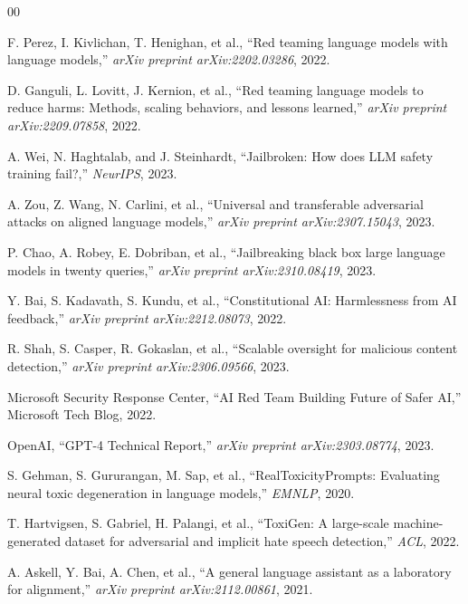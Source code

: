 \documentclass[compsoc,conference,a4paper,10pt,times]{IEEEtran}
\begin{document}

\begin{thebibliography}{00}

 F. Perez, I. Kivlichan, T. Henighan, et al., ``Red teaming language models with language models,'' \emph{arXiv preprint arXiv:2202.03286}, 2022.

 D. Ganguli, L. Lovitt, J. Kernion, et al., ``Red teaming language models to reduce harms: Methods, scaling behaviors, and lessons learned,'' \emph{arXiv preprint arXiv:2209.07858}, 2022.

 A. Wei, N. Haghtalab, and J. Steinhardt, ``Jailbroken: How does LLM safety training fail?,'' \emph{NeurIPS}, 2023.

 A. Zou, Z. Wang, N. Carlini, et al., ``Universal and transferable adversarial attacks on aligned language models,'' \emph{arXiv preprint arXiv:2307.15043}, 2023.

 P. Chao, A. Robey, E. Dobriban, et al., ``Jailbreaking black box large language models in twenty queries,'' \emph{arXiv preprint arXiv:2310.08419}, 2023.

 Y. Bai, S. Kadavath, S. Kundu, et al., ``Constitutional AI: Harmlessness from AI feedback,'' \emph{arXiv preprint arXiv:2212.08073}, 2022.

 R. Shah, S. Casper, R. Gokaslan, et al., ``Scalable oversight for malicious content detection,'' \emph{arXiv preprint arXiv:2306.09566}, 2023.

 Microsoft Security Response Center, ``AI Red Team Building Future of Safer AI,'' Microsoft Tech Blog, 2022.

 OpenAI, ``GPT-4 Technical Report,'' \emph{arXiv preprint arXiv:2303.08774}, 2023.

 S. Gehman, S. Gururangan, M. Sap, et al., ``RealToxicityPrompts: Evaluating neural toxic degeneration in language models,'' \emph{EMNLP}, 2020.

 T. Hartvigsen, S. Gabriel, H. Palangi, et al., ``ToxiGen: A large-scale machine-generated dataset for adversarial and implicit hate speech detection,'' \emph{ACL}, 2022.

 A. Askell, Y. Bai, A. Chen, et al., ``A general language assistant as a laboratory for alignment,'' \emph{arXiv preprint arXiv:2112.00861}, 2021.


\end{thebibliography}
\end{document}
